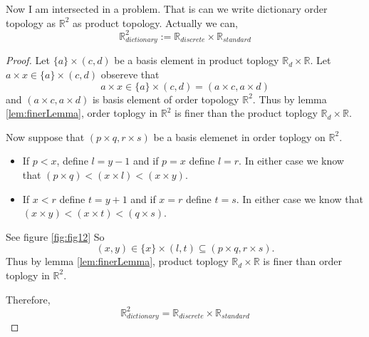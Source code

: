 \documentclass[
]{book}
\providecommand{\tightlist}{%
  \setlength{\itemsep}{0pt}\setlength{\parskip}{0pt}}
\theoremstyle{definition}
\theoremstyle{definition}
\theoremstyle{definition}
\theoremstyle{definition}
\theoremstyle{remark}
\begin{document}
Now I am intersected in a problem. That is can we write dictionary order topology as \(\mathbb{R}^2\) as product topology. Actually we can, \[\mathbb{R}^2_{dictionary}:=\mathbb{R}_{discrete }\times \mathbb{R}_{standard}\]

\begin{proof}
Let \(\{a\} \times (c,d)\) be a basis element in product toplogy \(\mathbb{R}_d \times \mathbb{R}\). Let \(a\times x\in \{a\} \times (c,d)\) obsereve that
\[a\times x\in \{a\} \times (c,d) = (a\times c,a\times d)\]
and \((a\times c,a\times d)\) is basis element of order topology \(\mathbb{R}^2\). Thus by lemma \ref{lem:finerLemma}, order toplogy in \(\mathbb{R}^2\) is finer than the product toplogy \(\mathbb{R}_d \times \mathbb{R}\).

Now suppose that \((p\times q, r \times s)\) be a basis elemenet in order toplogy on \(\mathbb{R}^2\).

\begin{itemize}
\tightlist
\item
  If \(p<x\), define \(l=y−1\) and if \(p=x\) define \(l=r\). In either case we know that \((p\times q)<(x\times l)<(x\times y)\).
\item
  If \(x<r\) define \(t=y+1\) and if \(x=r\) define \(t=s\). In either case we know that \((x\times y)<(x\times t)<(q \times s)\).
\end{itemize}

See figure \ref{fig:fig12}
So \[(x,y) \in \{x\} \times (l,t) \subseteq (p \times q, r \times s).\]
Thus by lemma \ref{lem:finerLemma}, product toplogy \(\mathbb{R}_d \times \mathbb{R}\) is finer than order toplogy in \(\mathbb{R}^2\).

Therefore, \[\mathbb{R}^2_{dictionary}=\mathbb{R}_{discrete }\times \mathbb{R}_{standard}\]
\end{proof}
\end{document}
